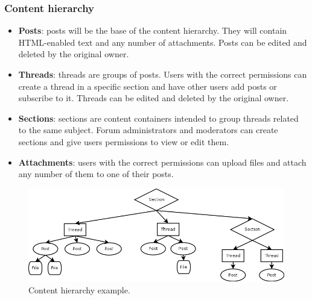 \documentclass[12pt]{report}
\renewcommand\emph{\textbf}
\begin{document}
                     \subsubsection{Content hierarchy}
                        \begin{itemize}
                            \item \emph{Posts}: posts will be the base of the content hierarchy. They will contain HTML-enabled text and any number of attachments.
                            Posts can be edited and deleted by the original owner.
                            \item \emph{Threads}: threads are groups of posts. Users with the correct permissions can create a thread in a specific section and have other users add posts or subscribe to it.
                            Threads can be edited and deleted by the original owner.
                            \item \emph{Sections}: sections are content containers intended to group threads related to the same subject. Forum administrators and moderators can create sections and give users permissions to view or edit them.
                            \item \emph{Attachments}: users with the correct permissions can upload files and attach any number of them to one of their posts.
                        \end{itemize}

                        \begin{figure}[!htb]
                        \caption{Content hierarchy example.}
                        \centering
                        \includegraphics[width=1\textwidth]{ed/hier_sec}
                        \end{figure}
\end{document}
